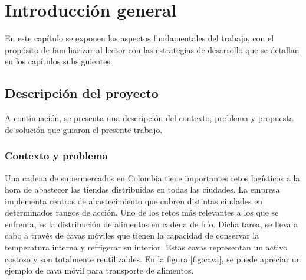 
\chapter{Introducción general} %

\label{Chapter1} %
\label{IntroGeneral}

En este capítulo se exponen los aspectos fundamentales del trabajo, con el propósito de familiarizar al lector con las estrategias de desarrollo que se detallan en los capítulos subsiguientes.


\newcommand{\keyword}[1]{\textbf{#1}}
\newcommand{\tabhead}[1]{\textbf{#1}}
\newcommand{\code}[1]{\texttt{#1}}
\newcommand{\file}[1]{\texttt{\bfseries#1}}
\newcommand{\option}[1]{\texttt{\itshape#1}}
\newcommand{\grados}{$^{\circ}$}




\section{Descripción del proyecto}
\label{sec:desc_general}

A continuación, se presenta una descripción del contexto, problema y propuesta de solución que guiaron el presente trabajo.

\subsection{Contexto y problema}

Una cadena de supermercados en Colombia tiene importantes retos logísticos a la hora de abastecer las tiendas distribuidas en todas las ciudades. La empresa implementa centros de abastecimiento que cubren distintas ciudades en determinados rangos de acción. Uno de los retos más relevantes a los que se enfrenta, es la distribución de alimentos en cadena de frío. Dicha tarea, se lleva a cabo a través de cavas móviles que tienen la capacidad de conservar la temperatura interna y refrigerar su interior. Estas cavas representan un activo costoso y son totalmente reutilizables. En la figura \ref{fig:cava}, se puede apreciar un ejemplo de cava móvil para transporte de alimentos. 

